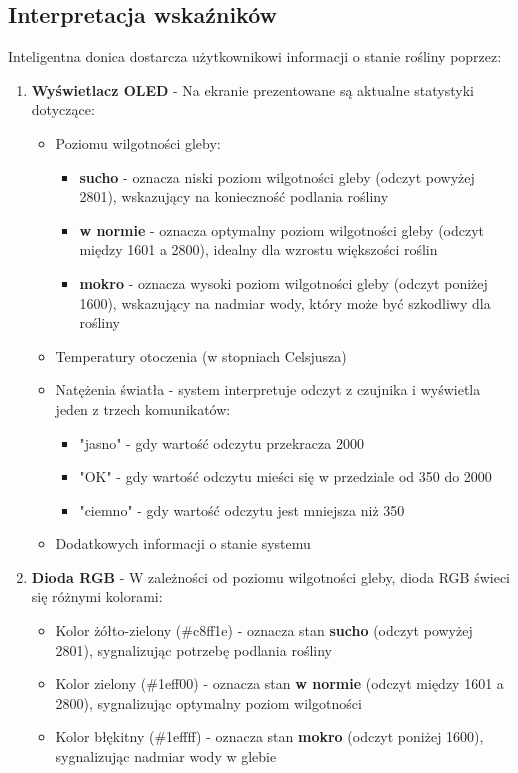 \documentclass{article}
\begin{document}
\subsection{Interpretacja wskaźników}
Inteligentna donica dostarcza użytkownikowi informacji o stanie rośliny poprzez:
\begin{enumerate} 
     \item \textbf{Wyświetlacz OLED} - Na ekranie prezentowane są aktualne statystyki dotyczące: 
     \begin{itemize} 
         \item Poziomu wilgotności gleby:
             \begin{itemize}
                \label{sec:wykorzystanie_ADC}
                 \item \textbf{sucho} - oznacza niski poziom wilgotności gleby (odczyt powyżej 2801), wskazujący na konieczność podlania rośliny
                 \item \textbf{w normie} - oznacza optymalny poziom wilgotności gleby (odczyt między 1601 a 2800), idealny dla wzrostu większości roślin
                 \item \textbf{mokro} - oznacza wysoki poziom wilgotności gleby (odczyt poniżej 1600), wskazujący na nadmiar wody, który może być szkodliwy dla rośliny
             \end{itemize}
         \item Temperatury otoczenia (w stopniach Celsjusza) 
         \item Natężenia światła - system interpretuje odczyt z czujnika i wyświetla jeden z trzech komunikatów:
         \begin{itemize}
             \item "jasno" - gdy wartość odczytu przekracza 2000
             \item "OK" - gdy wartość odczytu mieści się w przedziale od 350 do 2000
             \item "ciemno" - gdy wartość odczytu jest mniejsza niż 350
         \end{itemize}
         \item Dodatkowych informacji o stanie systemu 
     \end{itemize} 
     
     \item \textbf{Dioda RGB} - W zależności od poziomu wilgotności gleby, dioda RGB świeci się różnymi kolorami: 
     \begin{itemize} 
         \item Kolor żółto-zielony (\#c8ff1e) - oznacza stan \textbf{sucho} (odczyt powyżej 2801), sygnalizując potrzebę podlania rośliny
         \item Kolor zielony (\#1eff00) - oznacza stan \textbf{w normie} (odczyt między 1601 a 2800), sygnalizując optymalny poziom wilgotności
         \item Kolor błękitny (\#1effff) - oznacza stan \textbf{mokro} (odczyt poniżej 1600), sygnalizując nadmiar wody w glebie
     \end{itemize} 
 \end{enumerate}
\end{document}
